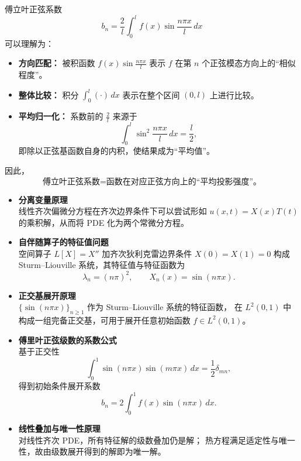 \begin{note}
傅立叶正弦系数
\[
b_n=\frac{2}{l}\int_0^l f(x)\sin\frac{n\pi x}{l}\,dx
\]
可以理解为：

\begin{itemize}
  \item \textbf{方向匹配：}
  被积函数 $f(x)\sin\frac{n\pi x}{l}$ 表示
  $f$ 在第 $n$ 个正弦模态方向上的“相似程度”。

  \item \textbf{整体比较：}
  积分 $\displaystyle \int_0^l(\cdot)\,dx$ 表示在整个区间
  $(0,l)$ 上进行比较。

  \item \textbf{平均归一化：}
  系数前的 $\frac{2}{l}$ 来源于
  \[
  \int_0^l \sin^2\frac{n\pi x}{l}\,dx=\frac{l}{2},
  \]
  即除以正弦基函数自身的内积，使结果成为“平均值”。
\end{itemize}

因此，
\[
\boxed{\text{傅立叶正弦系数}
= \text{函数在对应正弦方向上的“平均投影强度”。}}
\]
\end{note}
\begin{dxtips}

 \begin{itemize}
  \item \textbf{分离变量原理}\\
  线性齐次偏微分方程在齐次边界条件下可以尝试形如
  $u(x,t)=X(x)T(t)$ 的乘积解，从而将 PDE 化为两个常微分方程。

  \item \textbf{自伴随算子的特征值问题}\\
  空间算子 $L[X]=X''$ 加齐次狄利克雷边界条件 $X(0)=X(1)=0$ 构成
  Sturm–Liouville 系统，其特征值与特征函数为
  \[
    \lambda_n=(n\pi)^2,\qquad X_n(x)=\sin(n\pi x).
  \]

  \item \textbf{正交基展开原理}\\
  $\{\sin(n\pi x)\}_{n\ge1}$ 作为 Sturm–Liouville 系统的特征函数，
  在 $L^2(0,1)$ 中构成一组完备正交基，可用于展开任意初始函数
  $f\in L^2(0,1)$。

  \item \textbf{傅里叶正弦级数的系数公式}\\
  基于正交性
  \[
    \int_0^1 \sin(n\pi x)\sin(m\pi x)\,dx = \frac12\delta_{mn},
  \]
  得到初始条件展开系数
  \[
    b_n = 2\int_0^1 f(x)\sin(n\pi x)\,dx.
  \]

  \item \textbf{线性叠加与唯一性原理}\\
  对线性齐次 PDE，所有特征解的级数叠加仍是解；
  热方程满足适定性与唯一性，故由级数展开得到的解即为唯一解。

\end{itemize}
\end{dxtips}

